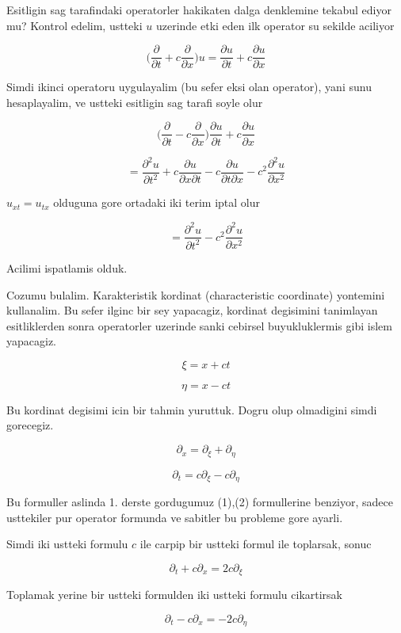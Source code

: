 \documentclass[12pt,fleqn]{article}\usepackage{../common}
\begin{document}
Esitligin sag tarafindaki operatorler hakikaten dalga denklemine tekabul
ediyor mu? Kontrol edelim, ustteki $u$ uzerinde etki eden ilk operator su
sekilde aciliyor

\[ \bigg( \frac{\partial }{\partial t} + c \frac{\partial }{\partial x}
\bigg) u = 
\frac{\partial u}{\partial t} + c \frac{\partial u}{\partial x}
\]

Simdi ikinci operatoru uygulayalim (bu sefer eksi olan operator), yani sunu
hesaplayalim, ve ustteki esitligin sag tarafi soyle olur

\[ 
\bigg( \frac{\partial }{\partial t} - c \frac{\partial }{\partial x} \bigg)
\frac{\partial u}{\partial t} + c \frac{\partial u}{\partial x} 
 \]

\[ = 
\frac{\partial ^2 u}{\partial t^2} + 
c \frac{\partial u}{\partial x \partial t} - 
c \frac{\partial u}{\partial t \partial x} - 
c^2\frac{\partial ^2 u}{\partial x^2} 
 \]

$u_{xt} = u_{tx}$ olduguna gore ortadaki iki terim iptal olur

\[ = 
\frac{\partial ^2 u}{\partial t^2} -
c^2\frac{\partial ^2 u}{\partial x^2} 
 \]

Acilimi ispatlamis olduk. 

Cozumu bulalim. Karakteristik kordinat (characteristic coordinate)
yontemini kullanalim. Bu sefer ilginc bir sey yapacagiz, kordinat
degisimini tanimlayan esitliklerden sonra operatorler uzerinde sanki
cebirsel buyukluklermis gibi islem yapacagiz. 

\[ \xi = x + ct \]

\[ \eta = x - ct \]

Bu kordinat degisimi icin bir tahmin yuruttuk. Dogru olup olmadigini simdi
gorecegiz. 

\[ \partial_x = \partial_\xi + \partial_\eta \]

\[ \partial_t = c\partial_\xi - c \partial_\eta \]

Bu formuller aslinda 1. derste gordugumuz (1),(2) formullerine benziyor,
sadece usttekiler pur operator formunda ve sabitler bu probleme gore
ayarli. 

Simdi iki ustteki formulu $c$ ile carpip bir ustteki formul ile toplarsak,
sonuc 

\[ \partial_t + c\partial_x = 2c \partial_\xi \]

Toplamak yerine bir ustteki formulden iki ustteki formulu cikartirsak

\[ \partial_t - c\partial_x = -2c \partial_\eta \]
\end{document}
